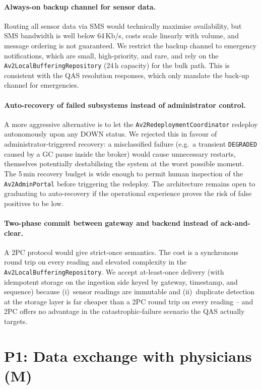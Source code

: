 \paragraph{Always-on backup channel for sensor data.}
Routing all sensor data via SMS would technically maximise availability,
but SMS bandwidth is well below 64\,Kb/s, costs scale linearly with
volume, and message ordering is not guaranteed. We restrict the backup
channel to emergency notifications, which are small, high-priority, and
rare, and rely on the \texttt{Av2LocalBufferingRepository} (24\,h
capacity) for the bulk path. This is consistent with the QAS resolution
responses, which only mandate the back-up channel for emergencies.

\paragraph{Auto-recovery of failed subsystems instead of administrator
control.}
A more aggressive alternative is to let the
\texttt{Av2RedeploymentCoordinator} redeploy autonomously upon any DOWN
status. We rejected this in favour of administrator-triggered recovery:
a misclassified failure (e.g.\ a transient \texttt{DEGRADED} caused by a
GC pause inside the broker) would cause unnecessary restarts, themselves
potentially destabilising the system at the worst possible moment. The
5\,min recovery budget is wide enough to permit human inspection of the
\texttt{Av2AdminPortal} before triggering the redeploy. The architecture
remains open to graduating to auto-recovery if the operational experience
proves the risk of false positives to be low.

\paragraph{Two-phase commit between gateway and backend instead of
ack-and-clear.}
A 2PC protocol would give strict-once semantics. The cost is a synchronous
round trip on every reading and elevated complexity in the
\texttt{Av2LocalBufferingRepository}. We accept at-least-once delivery
(with idempotent storage on the ingestion side keyed by gateway,
timestamp, and sequence) because (i)~sensor readings are immutable and
(ii)~duplicate detection at the storage layer is far cheaper than a 2PC
round trip on every reading -- and 2PC offers no advantage in the
catastrophic-failure scenario the QAS actually targets.


\section{P1: Data exchange with physicians (M)}
\label{sec:p1}

